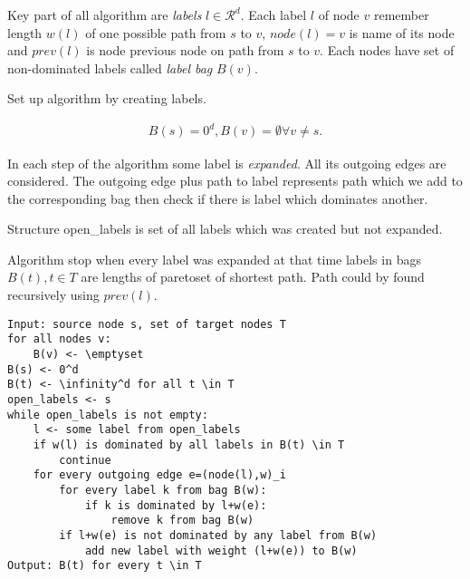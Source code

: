 Key part of all algorithm are \emph{labels} $l\in \mathcal{R}^d$.
Each label $l$ of node $v$ remember length $w(l)$  of one 
possible path from $s$ to $v$, $node(l) = v$ is name of its node
and $prev(l)$ is node previous node on path from $s$ to $v$.
Each nodes have set of non-dominated labels called \emph{label bag} $B(v)$.

Set up algorithm by creating labels.

\begin{gather*} 
B(s)=0^d, B(v)=\emptyset \forall v \ne s.
\end{gather*} 

In each step of the algorithm some label is \emph{expanded}. 
All its outgoing edges are considered. 
The outgoing edge plus path to label represents 
path which we add to the corresponding bag then check if there
is label which dominates another.

Structure open\_labels is set of all labels which was created but not expanded.

Algorithm stop when every label was expanded at that time
labels in bags $B(t), t \in T$ are lengths of paretoset of shortest path.
Path could by found recursively using $prev(l)$.


\begin{lstlisting}[caption={Meta Search Algorithm},label=list:8-6,captionpos=t,float,abovecaptionskip=-\medskipamount]
Input: source node s, set of target nodes T
for all nodes v:
	B(v) <- \emptyset
B(s) <- 0^d
B(t) <- \infinity^d for all t \in T
open_labels <- s
while open_labels is not empty:
	l <- some label from open_labels
    if w(l) is dominated by all labels in B(t) \in T
    	continue
    for every outgoing edge e=(node(l),w)_i
    	for every label k from bag B(w):
        	if k is dominated by l+w(e):
            	remove k from bag B(w)
        if l+w(e) is not dominated by any label from B(w)
        	add new label with weight (l+w(e)) to B(w)
Output: B(t) for every t \in T
\end{lstlisting}
